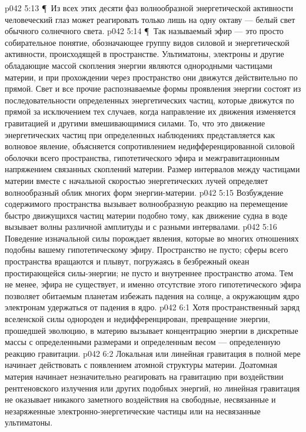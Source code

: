 \vs p042 5:13 \P\ Из всех этих десяти фаз волнообразной энергетической активности человеческий глаз может реагировать только лишь на одну октаву --- белый свет обычного солнечного света.
\vs p042 5:14 \P\ Так называемый эфир --- это просто собирательное понятие, обозначающее группу видов силовой и энергетической активности, происходящей в пространстве. Ультиматоны, электроны и другие обладающие массой скопления энергии являются однородными частицами материи, и при прохождении через пространство они движутся действительно по прямой. Свет и все прочие распознаваемые формы проявления энергии состоят из последовательности определенных энергетических частиц, которые движутся по прямой за исключением тех случаев, когда направление их движения изменяется гравитацией и другими вмешивающимися силами. То, что это движение энергетических частиц при определенных наблюдениях представляется как волновое явление, объясняется сопротивлением недифференцированной силовой оболочки всего пространства, гипотетического эфира и межгравитационным напряжением связанных скоплений материи. Размер интервалов между частицами материи вместе с начальной скоростью энергетических лучей определяет волнообразный облик многих форм энергии\hyp{}материи.
\vs p042 5:15 Возбуждение содержимого пространства вызывает волнообразную реакцию на перемещение быстро движущихся частиц материи подобно тому, как движение судна в воде вызывает волны различной амплитуды и с разными интервалами.
\vs p042 5:16 Поведение изначальной силы порождает явления, которые во многих отношениях подобны вашему гипотетическому эфиру. Пространство не пусто; сферы всего пространства вращаются и плывут, погружаясь в безбрежный океан простирающейся силы\hyp{}энергии; не пусто и внутреннее пространство атома. Тем не менее, эфира не существует, и именно отсутствие этого гипотетического эфира позволяет обитаемым планетам избежать падения на солнце, а окружающим ядро электронам удержаться от падения в ядро.
\vs p042 6:1 Хотя пространственный заряд вселенской силы однороден и недифференцирован, превращение энергии, прошедшей эволюцию, в материю вызывает концентрацию энергии в дискретные массы с определенными размерами и определенным весом --- определенную реакцию гравитации.
\vs p042 6:2 Локальная или линейная гравитация в полной мере начинает действовать с появлением атомной структуры материи. Доатомная материя начинает незначительно реагировать на гравитацию при воздействии рентгеновского излучения или других подобных энергий, но линейная гравитация не оказывает никакого заметного воздействия на свободные, несвязанные и незаряженные электронно\hyp{}энергетические частицы или на несвязанные ультиматоны.
